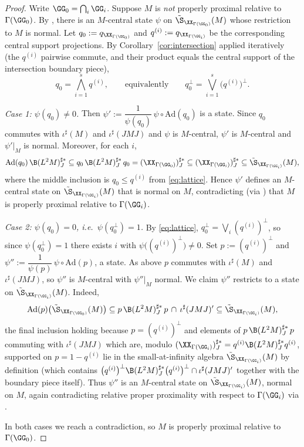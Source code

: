 \begin{proof}
Write $\GG_0=\bigcap_i\GG_i$. Suppose $M$ is \emph{not} properly proximal relative to
$\Gamma(\GG_0)$. By \cite[Lemma 8.5]{DKEP23}, there is an $M$-central state $\psi$ on
$\tilde\S_{\XX_{\Gamma(\GG_0)}}(M)$ whose restriction to $M$ is normal. Let
$q_0:=q_{\XX_{\Gamma(\GG_0)}}$ and $q^{(i)}:=q_{\XX_{\Gamma(\GG_i)}}$ be the corresponding
central support projections. By Corollary~\ref{cor:intersection} applied iteratively
(the $q^{(i)}$ pairwise commute, and their product equals the central support of the
intersection boundary piece),
\begin{equation}\label{eq:lattice}
q_0=\bigwedge_{i=1}^s q^{(i)},\qquad\text{equivalently}\qquad
q_0^\perp=\bigvee_{i=1}^s \big(q^{(i)}\big)^\perp .
\end{equation}

\emph{Case 1: $\psi(q_0)\neq 0$.} Then
$\psi':=\dfrac{1}{\psi(q_0)}\,\psi\circ\mathrm{Ad}(q_0)$ is a state. Since $q_0$ commutes with
$\iota^\sharp(M)$ and $\iota^\sharp(JMJ)$ and $\psi$ is $M$-central, $\psi'$ is $M$-central
and $\psi'|_M$ is normal. Moreover, for each $i$,
\[
\mathrm{Ad}(q_0)\,\B(L^2M)^{\sharp*}_J\subseteq q_0\,\B(L^2M)^{\sharp*}_J\,q_0
=(\XX_{\Gamma(\GG_0)})^{\sharp*}_J\subseteq(\XX_{\Gamma(\GG_i)})^{\sharp*}_J
\subseteq\tilde\S_{\XX_{\Gamma(\GG_i)}}(M),
\]
where the middle inclusion is $q_0\le q^{(i)}$ from \eqref{eq:lattice}. Hence $\psi'$ defines
an $M$-central state on $\tilde\S_{\XX_{\Gamma(\GG_i)}}(M)$ that is normal on $M$,
contradicting (via \cite[Lemma 8.5]{DKEP23}) that $M$ is properly proximal relative to
$\Gamma(\GG_i)$.

\emph{Case 2: $\psi(q_0)=0$, i.e.\ $\psi(q_0^\perp)=1$.} By \eqref{eq:lattice},
$q_0^\perp=\bigvee_i (q^{(i)})^\perp$, so since $\psi(q_0^\perp)=1$ there exists $i$ with
$\psi\big((q^{(i)})^\perp\big)\neq 0$. Set $p:=(q^{(i)})^\perp$ and
$\psi'':=\dfrac{1}{\psi(p)}\,\psi\circ\mathrm{Ad}(p)$, a state. As above $p$ commutes with
$\iota^\sharp(M)$ and $\iota^\sharp(JMJ)$, so $\psi''$ is $M$-central with $\psi''|_M$ normal.
We claim $\psi''$ restricts to a state on $\tilde\S_{\XX_{\Gamma(\GG_i)}}(M)$. Indeed,
\[
\mathrm{Ad}(p)\big(\tilde\S_{\XX_{\Gamma(\GG_0)}}(M)\big)
\subseteq p\,\B(L^2M)^{\sharp*}_J\,p\,\cap\,\iota^\sharp(JMJ)'
\subseteq\tilde\S_{\XX_{\Gamma(\GG_i)}}(M),
\]
the final inclusion holding because $p=(q^{(i)})^\perp$ and elements of
$p\,\B(L^2M)^{\sharp*}_J\,p$ commuting with $\iota^\sharp(JMJ)$ which are, modulo
$(\XX_{\Gamma(\GG_i)})^{\sharp*}_J=q^{(i)}\B(L^2M)^{\sharp*}_J q^{(i)}$, supported on
$p=1-q^{(i)}$ lie in the small-at-infinity algebra
$\tilde\S_{\XX_{\Gamma(\GG_i)}}(M)$ by definition (which contains
$\big(q^{(i)}\big)^\perp\B(L^2M)^{\sharp*}_J\big(q^{(i)}\big)^\perp\cap\iota^\sharp(JMJ)'$
together with the boundary piece itself). Thus $\psi''$ is an $M$-central state on
$\tilde\S_{\XX_{\Gamma(\GG_i)}}(M)$, normal on $M$, again contradicting relative proper
proximality with respect to $\Gamma(\GG_i)$ via \cite[Lemma 8.5]{DKEP23}.

In both cases we reach a contradiction, so $M$ is properly proximal relative to
$\Gamma(\GG_0)$.
\end{proof}

